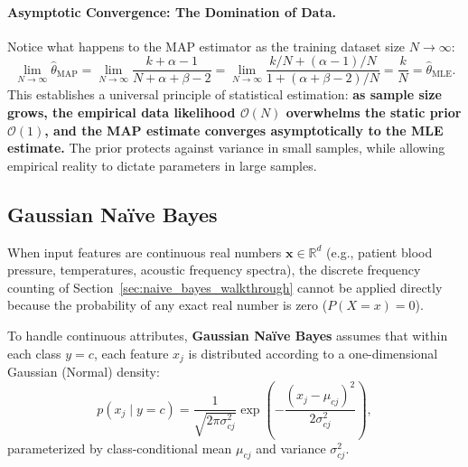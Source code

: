\paragraph{Asymptotic Convergence: The Domination of Data.}
Notice what happens to the MAP estimator as the training dataset size $N \to \infty$:
\begin{equation}
\lim_{N \to \infty} \hat{\theta}_{\text{MAP}} = \lim_{N \to \infty} \frac{k + \alpha - 1}{N + \alpha + \beta - 2} = \lim_{N \to \infty} \frac{k/N + (\alpha - 1)/N}{1 + (\alpha + \beta - 2)/N} = \frac{k}{N} = \hat{\theta}_{\text{MLE}}.
\end{equation}
This establishes a universal principle of statistical estimation: \textbf{as sample size grows, the empirical data likelihood $\mathcal{O}(N)$ overwhelms the static prior $\mathcal{O}(1)$, and the MAP estimate converges asymptotically to the MLE estimate.} The prior protects against variance in small samples, while allowing empirical reality to dictate parameters in large samples.

\subsection{Gaussian Naïve Bayes}
\label{sec:continuous_gaussian_nb}

When input features are continuous real numbers $\mathbf{x} \in \mathbb{R}^d$ (e.g., patient blood pressure, temperatures, acoustic frequency spectra), the discrete frequency counting of Section~\ref{sec:naive_bayes_walkthrough} cannot be applied directly because the probability of any exact real number is zero ($P(X = x) = 0$).

To handle continuous attributes, \textbf{Gaussian Naïve Bayes} assumes that within each class $y = c$, each feature $x_j$ is distributed according to a one-dimensional Gaussian (Normal) density:
\begin{equation}
p(x_j \mid y = c) = \frac{1}{\sqrt{2\pi \sigma_{cj}^2}} \exp\left( -\frac{(x_j - \mu_{cj})^2}{2\sigma_{cj}^2} \right),
\label{eq:gaussian_nb_feature_density}
\end{equation}
parameterized by class-conditional mean $\mu_{cj}$ and variance $\sigma_{cj}^2$.

